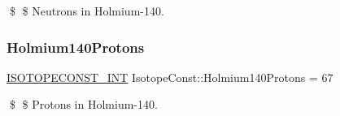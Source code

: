 \$ \$ Neutrons in Holmium-\/140. \mbox{\label{group___isotope_const-_holmium-_ho140_gae383ee4bf5a770112762b9f55b8080b7}} 
\subsubsection{\texorpdfstring{Holmium140\+Protons}{Holmium140Protons}}
{\footnotesize\ttfamily \mbox{\hyperlink{group___isotope_const-_macros_ga5f18360b3e99483a35c32d789e62621c}{I\+S\+O\+T\+O\+P\+E\+C\+O\+N\+S\+T\+\_\+\+I\+NT}} Isotope\+Const\+::\+Holmium140\+Protons = 67}

\$ \$ Protons in Holmium-\/140. 